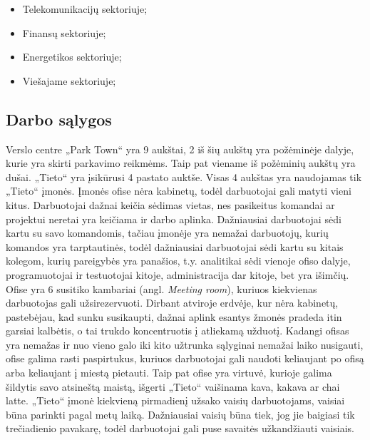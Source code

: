 \documentclass{VUMIFPSbakalaurinis}
\begin{document}
\begin{itemize}
    \item Telekomunikacijų sektoriuje;
    \item Finansų sektoriuje;
    \item Energetikos sektoriuje;
    \item Viešajame sektoriuje;
\end{itemize}

\subsection{Darbo sąlygos}
Verslo centre „Park Town“ yra 9 aukštai, 2 iš šių aukštų yra požėminėje dalyje, kurie yra skirti parkavimo reikmėms. Taip pat viename iš požėminių aukštų yra dušai. „Tieto“ yra įsikūrusi 4 pastato auktše. Visas 4 aukštas yra naudojamas tik „Tieto“ įmonės. Įmonės ofise nėra kabinetų, todėl darbuotojai gali matyti vieni kitus. Darbuotojai dažnai keičia sėdimas vietas, nes pasikeitus komandai ar projektui neretai yra keičiama ir darbo aplinka. Dažniausiai darbuotojai sėdi kartu su savo komandomis, tačiau įmonėje yra nemažai darbuotojų, kurių komandos yra tarptautinės, todėl dažniausiai darbuotojai sėdi kartu su kitais kolegom, kurių pareigybės yra panašios, t.y. analitikai sėdi vienoje ofiso dalyje, programuotojai ir testuotojai kitoje, administracija dar kitoje, bet yra išimčių. Ofise yra 6 susitiko kambariai (angl. \textit{Meeting room}), kuriuos kiekvienas darbuotojas gali užsirezervuoti. Dirbant atviroje erdvėje, kur nėra kabinetų, pastebėjau, kad sunku susikaupti, dažnai aplink esantys žmonės pradeda itin garsiai kalbėtis, o tai trukdo koncentruotis į atliekamą užduotį. Kadangi ofisas yra nemažas ir nuo vieno galo iki kito užtrunka sąlyginai nemažai laiko nusigauti, ofise galima rasti paspirtukus, kuriuos darbuotojai gali naudoti keliaujant po ofisą arba keliaujant į miestą pietauti. Taip pat ofise yra virtuvė, kurioje galima šildytis savo atsineštą maistą, išgerti „Tieto“ vaišinama kava, kakava ar chai latte. „Tieto“ įmonė kiekvieną pirmadienį užsako vaisių darbuotojams, vaisiai būna parinkti pagal metų laiką. Dažniausiai vaisių būna tiek, jog jie baigiasi tik trečiadienio pavakarę, todėl darbuotojai gali puse savaitės užkandžiauti vaisiais.
\end{document}
